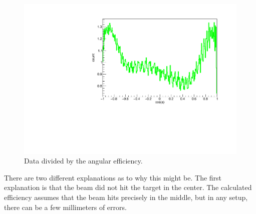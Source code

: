 \begin{figure}[h]
	\centering
	\includegraphics[width=\linewidth]{../figures/betaAngles/dataDivEff.pdf}
	\caption{Data divided by the angular efficiency. }
	\label{fig:dataDivEff}
\end{figure}

There are two different explanations as to why this might be.
The first explanation is that the beam did not hit the target in the center. The calculated efficiency assumes that the beam hits precisely in the middle, but in any setup, there can be a few millimeters of errors. 

